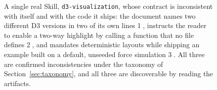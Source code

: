 \begin{figure}[t]
  \caption{A single real Skill, \texttt{d3-visualization}, whose contract is
    inconsistent with itself and with the code it ships: the document names two
    different D3 versions in two of its own lines \textcircled{1}, instructs the
    reader to enable a two-way highlight by calling a function that no file
    defines \textcircled{2}, and mandates deterministic layouts while shipping an
    example built on a default, unseeded force simulation \textcircled{3}.
    All three are confirmed inconsistencies under the taxonomy of
    Section~\ref{sec:taxonomy}, and all three are discoverable by reading the
    artifacts.}
  \label{fig:motivation}
\end{figure}
